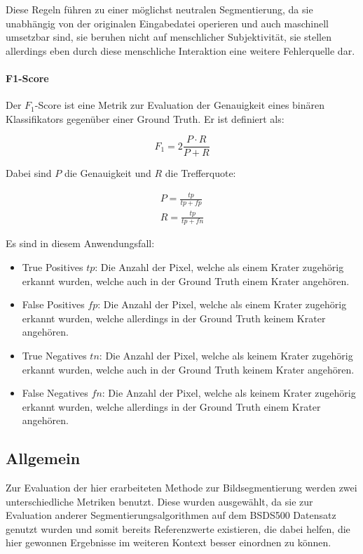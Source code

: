 Diese Regeln führen zu einer möglichst neutralen Segmentierung, da sie unabhängig von der originalen Eingabedatei operieren und auch maschinell umsetzbar sind, \dahe sie beruhen nicht auf menschlicher Subjektivität, sie stellen allerdings eben durch diese menschliche Interaktion eine weitere Fehlerquelle dar.

\paragraph{F1-Score}

Der $F_1$-Score ist eine Metrik zur Evaluation der Genauigkeit eines binären Klassifikators gegenüber einer Ground Truth. Er ist definiert als: \cite{chinchor_92}

\begin{equation}
F_1 = 2\frac{P\cdot R}{P+R}
\end{equation}

Dabei sind $P$ die Genauigkeit und $R$ die Trefferquote:

\begin{eqnarray}
P = \frac{tp}{tp+fp}\\
R = \frac{tp}{tp+fn}
\end{eqnarray}

Es sind in diesem Anwendungsfall:

\begin{itemize}
	\item{True Positives $tp$:} Die Anzahl der Pixel, welche als einem Krater zugehörig erkannt wurden, welche auch in der Ground Truth einem Krater angehören.
	\item{False Positives $fp$:} Die Anzahl der Pixel, welche als einem Krater zugehörig erkannt wurden, welche allerdings in der Ground Truth keinem Krater angehören.
	\item{True Negatives $tn$:} Die Anzahl der Pixel, welche als keinem Krater zugehörig erkannt wurden, welche auch in der Ground Truth keinem Krater angehören.
	\item{False Negatives $fn$:} Die Anzahl der Pixel, welche als keinem Krater zugehörig erkannt wurden, welche allerdings in der Ground Truth einem Krater angehören.
\end{itemize}

\subsection{Allgemein}
\label{ssec:eval_general}

Zur Evaluation der hier erarbeiteten Methode zur Bildsegmentierung werden zwei unterschiedliche Metriken benutzt. Diese wurden ausgewählt, da sie zur Evaluation anderer Segmentierungsalgorithmen auf dem BSDS500 Datensatz \cite{bsd500} genutzt wurden und somit bereits Referenzwerte existieren, die dabei helfen, die hier gewonnen Ergebnisse im weiteren Kontext besser einordnen zu können. \cite{arbelaez_10, xia_17}

